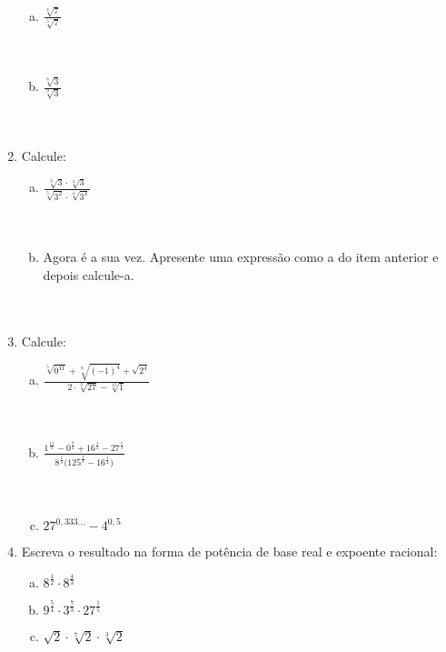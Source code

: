 \documentclass[a4paper,14pt]{article}
\begin{document}
\begin{multicols}{2}
\begin{enumerate}
\begin{enumerate}[a)]
        	\item $\frac{\sqrt[4]{7}}{\sqrt[5]{7}}$ \\\\\\
        	\item $\frac{\sqrt[8]{3}}{\sqrt[9]{3}}$ \\\\\\
        \end{enumerate}
        \item Calcule:
        \begin{enumerate}[a)]
            \item $\frac{\sqrt[3]{3} \cdot \sqrt[4]{3}}{\sqrt[5]{3^2} \cdot \sqrt[4]{3^3}}$ \\\\\\
            \item Agora é a sua vez. Apresente uma expressão como a do item anterior e depois calcule-a. \\\\\\
        \end{enumerate}
        \item Calcule:
        \begin{enumerate}[a)]
        	\item $\frac{\sqrt[5]{0^{11}} + \sqrt[9]{(-1)^4} + \sqrt{2^4}}{2 \cdot \sqrt[3]{27}- \sqrt[12]{1}}$ \\\\\\
        	\item $\frac{1^\frac{11}{2} - 0^\frac{3}{4} + 16^\frac{1}{2} - 27^\frac{1}{3}}{8^\frac{1}{3} \bigg(125^\frac{1}{3} - 16^\frac{1}{4} \bigg)}$ \\\\\\
        	\item $27^{0,333...} - 4^{0,5}$
       \end{enumerate}
       \item Escreva o resultado na forma de potência de base real e expoente racional:
       \begin{enumerate}[a)]
           \item $8^\frac{1}{2} \cdot 8^\frac{4}{3}$ \\
           \item $9^\frac{5}{4} \cdot 3^\frac{7}{3} \cdot 27^\frac{1}{5}$ \\
           \item $\sqrt{2} \cdot \sqrt[7]{2} \cdot \sqrt[3]{2}$ \\

\end{enumerate}
\end{enumerate}
\end{multicols}
\end{document}
